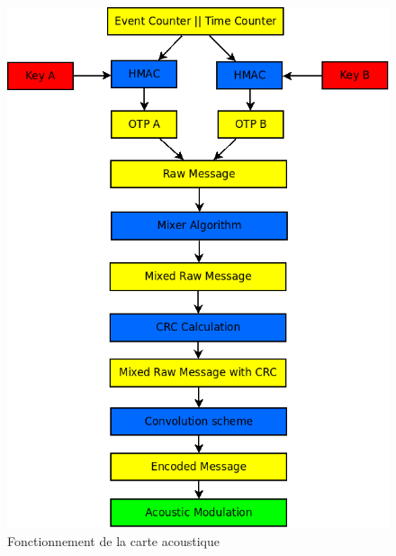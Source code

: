 \begin{figure}[!htbp]
  \centering
    \includegraphics[scale=0.6]{images/organigramme}
  \caption{Fonctionnement de la carte acoustique}
\end{figure}





